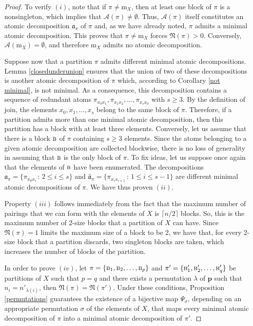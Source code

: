 \documentclass[12pt]{extarticle}
\begin{document}
	\begin{proof}
		
		To verify  $(i)$, note that if $\pi\neq \textrm{m}_X$, then at least one block of $\pi$ is a nonsingleton, which implies that $\mathcal{A}(\pi)\neq \emptyset$. Thus, $\mathcal{A}(\pi)$ itself constitutes an atomic decomposition $\mathfrak{a}_{\pi}$ of $\pi$ and, as we have already noted, $\pi$ admits a minimal atomic decomposition. This proves that $\pi\neq \textrm{m}_X$ forces $\mathfrak{N}(\pi)>0$. Conversely, $\mathcal{A}(\textrm{m}_X)= \emptyset$, and therefore $\textrm{m}_X$ admits no atomic decomposition.
		
		Suppose now that a partition $\pi$ admits different minimal atomic decompositions. Lemma \ref{closedunderunion} ensures that the union of two of these decompositions is another atomic decomposition of $\pi$ which, according to Corollary \ref{not minimal}, is not minimal. As a consequence, this decomposition contains a sequence of redundant atoms $\pi_{x_0x_1}, \pi_{x_1x_2}, \ldots, \pi_{x_sx_0}$ with $s\geq 3$. By the definition of join, the elements $x_0, x_1,\ldots, x_s$ belong to the same block of $\pi$. Therefore, if a partition admits more than one minimal atomic decomposition, then this partition has a block with at least three elements. Conversely, let us assume that there is a block $\textsc{b}$ of $\pi$ containing $s\geq 3$ elements. Since the atoms belonging to a given atomic decomposition are collected blockwise, there is no loss of generality in assuming that $\textsc{b}$ is the only block of $\pi$. To fix ideas, let us suppose once again that the elements of $\textsc{b}$ have been enumerated. The decompositions $\mathfrak{a}_{\pi}=\{\pi_{x_0x_i}\,:\, 2\leq i\leq s\}$ and $\hat{\mathfrak{a}}_{\pi}=\{\pi_{x_ix_{i+1}}\,:\, 1\leq i\leq s-1\}$  are different minimal atomic decompositions of $\pi$.  We have thus proven $(ii)$.
		
		Property $(iii)$ follows immediately from the fact that the maximum number of pairings that we can form 
		with the elements of $X$ is $\lceil n/2\rceil$ blocks. So, this is the maximum number of 2-size blocks that a partition of $X$ can have. Since $\mathfrak{N}(\pi)=1$ limits the maximum size of a block to be 2, we have that, for every 2-size block that a partition discards, two singleton blocks are taken, which increases the number of blocks of the partition.
		
		In order to prove $(iv)$, let $\pi=\{\textsc{b}_1, \textsc{b}_2,\ldots,\textsc{b}_p\}$ and $\pi'=\{\textsc{b}'_1, \textsc{b}'_2,\ldots,\textsc{b}'_q\}$ be partitions of $X$ such that $p = q$ and there exists a permutation $\lambda$ of $\mathbf{p}$ such that $n_i = n'_{\lambda(i)}$, then $\mathfrak{N}(\pi) = \mathfrak{N}(\pi')$. 
		Under these conditions, Proposition \ref{permutations} guarantees the existence of a bijective map $\Psi_{\sigma}$, depending on an appropriate permutation $\sigma$ of the elements of $X$, that maps every minimal atomic decomposition of $\pi$ into a minimal atomic decomposition of $\pi'$.
		

\end{proof}
\end{document}
